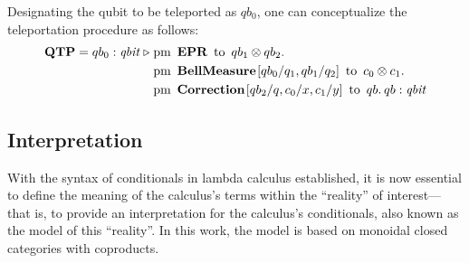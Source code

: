 \documentclass[10pt,a4paper]{amsart}
\theoremstyle{definition}
\theoremstyle{definition}
\theoremstyle{definition}
\theoremstyle{definition}
\theoremstyle{definition}
\theoremstyle{definition}
\begin{document}
 Designating the qubit to be teleported as $qb_0$, one can conceptualize the teleportation procedure as follows:
 \begin{align*}
  \textbf{QTP} = qb_{0}: \textit{qbit}\hspace{3 pt} \triangleright \hspace{3 pt} & \text{pm} \hspace{5pt} \textbf{EPR} \hspace{5pt} \text{to} \hspace{5pt}  qb_{1} \otimes qb_{2}.  \notag \\
     & \text{pm}\hspace{5pt} \textbf{BellMeasure} \hspace{1pt} [qb_0/q_1,qb_{1}/q_2] \hspace{5pt}  \text{to} \hspace{5pt} c_{0}\otimes c_{1} . \notag \\
     & \text{pm} \hspace{5pt}  \textbf{Correction} \hspace{1pt} [qb_{2}/q,c_{0}/x, c_{1}/y]  \hspace{5pt} \text{to} \hspace{5pt}  qb. \hspace{2pt}  qb : \textit{qbit} 
 \end{align*}

 
 \subsection{Interpretation}

With the syntax of conditionals in lambda calculus established, it is now essential to define the meaning of the calculus's terms within the ``reality'' of interest—that is, to provide an interpretation for the calculus's conditionals, also known as the model of this ``reality''. In this work, the model is based on monoidal closed categories with coproducts. 
\end{document}
